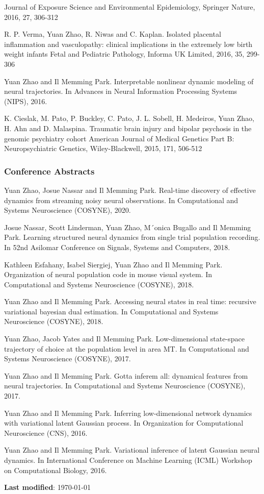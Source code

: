 \documentclass[12pt, letterpaper]{article}
\begin{document}
\begin{enumerate}[label={[\arabic*]}]
    Journal of Exposure Science and Environmental Epidemiology, Springer Nature, 2016, 27, 306-312 
    \item R. P. Verma, Yuan Zhao, R. Niwas and C. Kaplan.
    Isolated placental inflammation and vasculopathy: clinical implications in the extremely low birth weight infants 
    Fetal and Pediatric Pathology, Informa UK Limited, 2016, 35, 299-306 
    \item Yuan Zhao and Il Memming Park. Interpretable nonlinear dynamic modeling of neural trajectories. In Advances in Neural Information Processing Systems (NIPS), 2016.
    \item K. Cieslak, M. Pato, P. Buckley, C. Pato, J. L. Sobell, H. Medeiros, Yuan Zhao, H. Ahn and D. Malaspina.
    Traumatic brain injury and bipolar psychosis in the genomic psychiatry cohort American Journal of Medical Genetics Part B: Neuropsychiatric Genetics, Wiley-Blackwell, 2015, 171, 506-512 
\end{enumerate}

\subsubsection*{Conference Abstracts}
\begin{enumerate}[label={[\arabic*]}]
    \item Yuan Zhao, Josue Nassar and Il Memming Park. Real-time discovery of effective dynamics from streaming noisy neural observations. In Computational and Systems Neuroscience (COSYNE), 2020.
    \item Josue Nassar, Scott Linderman, Yuan Zhao, M´onica Bugallo and Il Memming Park. Learning structured neural dynamics from single trial population recording. In 52nd Asilomar Conference on Signals, Systems and Computers, 2018.
    \item Kathleen Esfahany, Isabel Siergiej, Yuan Zhao and Il Memming Park. Organization of neural population code in mouse visual system. In Computational and Systems Neuroscience (COSYNE), 2018.
    \item Yuan Zhao and Il Memming Park. Accessing neural states in real time: recursive variational bayesian dual estimation. In Computational and Systems Neuroscience (COSYNE), 2018.
    \item Yuan Zhao, Jacob Yates and Il Memming Park. Low-dimensional state-space trajectory of choice at the population level in area MT. In Computational and Systems Neuroscience (COSYNE), 2017.
    \item Yuan Zhao and Il Memming Park. Gotta inferem all: dynamical features from neural trajectories. In Computational and Systems Neuroscience (COSYNE), 2017.
    \item Yuan Zhao and Il Memming Park. Inferring low-dimensional network dynamics with variational latent Gaussian process. In Organization for Computational Neuroscience (CNS), 2016.
    \item Yuan Zhao and Il Memming Park. Variational inference of latent Gaussian neural dynamics. In International Conference on Machine Learning (ICML) Workshop on Computational Biology, 2016.
\end{enumerate}

\vfill\hfill\textbf{Last modified}: \today 
\end{document}
